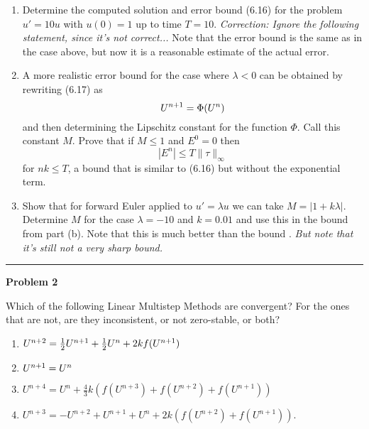 \documentclass[10pt]{article}
\begin{document}
\begin{enumerate}
\item Determine the computed solution and error bound (6.16) for the problem
$u' = 10u$ with $u(0)=1$ up to time $T=10$.  {\em Correction: Ignore the
following statement, since it's not correct...}  Note that the error bound is
the same as in the case above, but now it is a reasonable estimate of the
actual error.

\item A more realistic error bound for the case where $\lambda<0$ can be
obtained by rewriting (6.17) as
\[
U^{n+1} = \Phi(U^n)
\]
and then determining the Lipschitz constant for the function $\Phi$.
Call this constant $M$.  Prove that if $M\leq 1$  and $E^0=0$ then
\[
|E^n| \leq  T\|\tau\|_\infty
\]
for $nk\leq T$, a bound that is similar to (6.16) but without the
exponential term.


\item Show that for forward Euler applied to $u'=\lambda
u$ we can take $M = |1+k\lambda|$.  Determine $M$ for the case $\lambda =
-10$ and $k=0.01$ and use this in the bound from part (b).
Note that this is much better than the bound .
{\em But note that it's still not a very sharp bound.}

\end{enumerate}







\vskip 1cm
\hrule
{\bf Problem 2}

Which of the following Linear Multistep Methods are convergent?  For 
the ones that are not, are they inconsistent, or not zero-stable, or both?
 \begin{enumerate}
 \item $U^{n+2} = \frac{1}{2} U^{n+1} + \frac{1}{2} U^{n} + 2kf(U^{n+1})$
 \item $U^{n+1} = U^n$ 
 \item $U^{n+4} = U^{n} + \frac 4 3 k(f(U^{n+3})+f(U^{n+2})+f(U^{n+1}))$
 \item $U^{n+3} = -U^{n+2} + U^{n+1} +U^{n}+2k(f(U^{n+2})+f(U^{n+1}))$.
 \end{enumerate}



\end{document}
